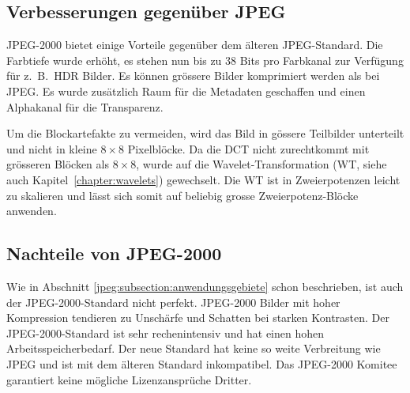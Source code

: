 \subsection{Verbesserungen gegenüber JPEG
\label{jpeg:subsection:verbesserungen}}
JPEG-2000 bietet einige Vorteile gegenüber dem älteren JPEG-Standard.
Die Farbtiefe wurde erhöht, es stehen nun bis zu 38 Bits pro Farbkanal zur Verfügung für z.~B.~HDR Bilder.
%
Es können grössere Bilder komprimiert werden als bei JPEG.
Es wurde zusätzlich Raum für die Metadaten geschaffen und einen Alphakanal für die Transparenz.
%
%
 
Um die Blockartefakte zu vermeiden, wird das Bild in gössere Teilbilder unterteilt und nicht in kleine \(8\times8\) Pixelblöcke.
Da die DCT nicht zurechtkommt mit grösseren Blöcken als \(8\times8\), wurde auf die Wavelet-Transformation (WT, siehe auch Kapitel~\ref{chapter:wavelets}) gewechselt.
Die WT ist in Zweierpotenzen leicht zu skalieren und lässt sich somit auf beliebig grosse Zweierpotenz-Blöcke anwenden.

\subsection{Nachteile von JPEG-2000
\label{jpeg:subsection:nachteil}}
Wie in Abschnitt \ref{jpeg:subsection:anwendungsgebiete} schon beschrieben, ist auch der JPEG-2000-Standard nicht perfekt.
JPEG-2000 Bilder mit hoher Kompression tendieren zu Unschärfe und Schatten bei starken Kontrasten. 
Der JPEG-2000-Standard ist sehr rechenintensiv und hat einen hohen Arbeitsspeicherbedarf. 
Der neue Standard hat keine so weite Verbreitung wie JPEG und ist mit dem älteren Standard inkompatibel.
Das JPEG-2000 Komitee garantiert keine mögliche Lizenzansprüche Dritter.
